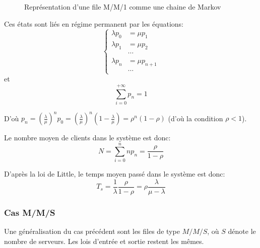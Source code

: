     \begin{figure}[h]
      \centering
      \caption{Représentation d'une file M/M/1 comme une chaine de Markov
        \cite{procstochs_cc}}
      \label{fig:markov1}
    \end{figure}

    Ces états sont liés en régime permanent par les équations:
      \[
        \left\{\begin{aligned}
          \lambda p_0 & = \mu p_1 \\
          \lambda p_1 & = \mu p_2 \\
          & \cdots \\
          \lambda p_n & = \mu p_{n+1} \\
          & \cdots 
        \end{aligned}\right.
      \]
    et
      \[
        \sum_{i=0}^{+\infty} p_n = 1
      \]

    D'où $p_n = \left(\frac \lambda \mu\right)^n p_0 =
     \left(\frac \lambda \mu\right)^n \left(1-\frac \lambda \mu\right) =
     \rho^n (1-\rho)$ (d'où la condition $\rho < 1$).

   Le nombre moyen de clients dans le système est donc:
     \[ N = \sum_{i=0}^n np_n = \frac \rho {1-\rho} \]

   D'après la loi de Little, le temps moyen passé dans le système est donc:
     \[
       T_s = \frac 1 \lambda \frac \rho {1-\rho}
           = \rho \frac \lambda {\mu-\lambda}
     \]

  \subsubsection{Cas M/M/S}
    Une généralisation du cas précédent sont les files de type $M/M/S$, où $S$
    dénote le nombre de serveurs. Les lois d'entrée et sortie restent les mêmes.

